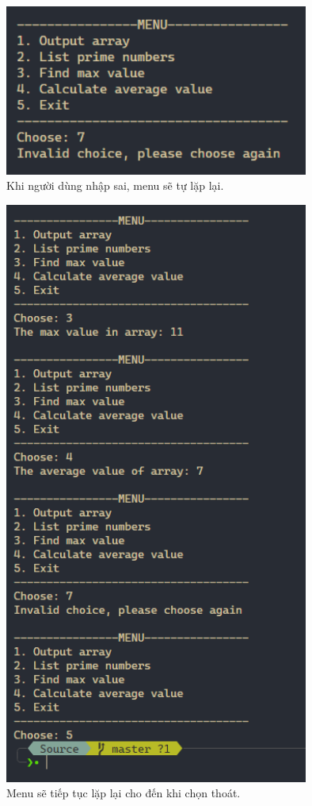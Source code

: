 \begin{figure}[H]
	\centering
	\includegraphics[width=10cm]{images/img5_invalid.PNG}
	\caption{Khi người dùng nhập sai, menu sẽ tự lặp lại.}
\end{figure}

\begin{figure}[H]
	\centering
	\includegraphics[width=10cm]{images/img5_6.PNG}
	\caption{Menu sẽ tiếp tục lặp lại cho đến khi chọn thoát.}

\end{figure}
